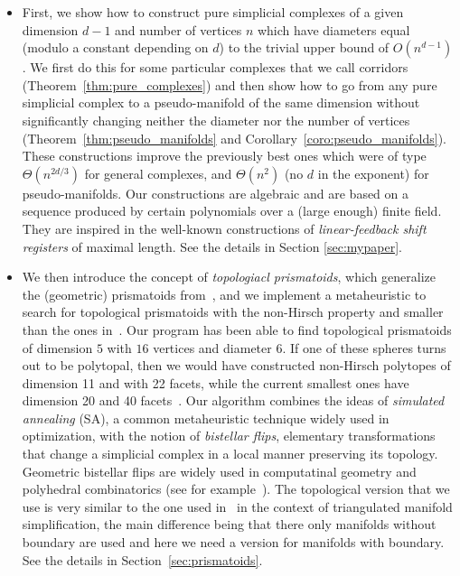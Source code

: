 \documentclass[12pt,a4paper]{article}
\theoremstyle{plain}
\theoremstyle{definition}
\begin{document}
\begin{itemize}
\item First, we show how to construct pure simplicial complexes of a given dimension $d-1$ and number of vertices $n$ which have diameters equal (modulo a constant depending on $d$) to the trivial upper bound of $O(n^{d-1})$. We first do this for some particular complexes that we call corridors 
(Theorem~\ref{thm:pure_complexes}) and then show how to go from any pure simplicial complex to a pseudo-manifold of the same dimension without significantly changing neither the diameter nor the number of vertices (Theorem~\ref{thm:pseudo_manifolds} and Corollary~\ref{coro:pseudo_manifolds}). These constructions improve the previously best ones which were of type $\Theta(n^{2d/3})$ for general complexes, and $\Theta(n^2)$ (no $d$ in the exponent) for pseudo-manifolds. Our constructions are algebraic and are based on a sequence produced by certain polynomials over a (large enough) finite field. They are inspired in the well-known constructions of \emph{linear-feedback shift registers} of maximal length. See the details in Section \ref{sec:mypaper}.

\item We then introduce the concept of \emph{topologiacl prismatoids}, which generalize the (geometric) prismatoids from~\cite{counterexample,improvement}, and we implement a metaheuristic to search for topological prismatoids with the non-Hirsch property and smaller than the ones in~\cite{counterexample,improvement}. Our program has been able to find topological prismatoids of dimension $5$ with $16$ vertices and diameter $6$. If one of these spheres turns out to be polytopal, then we would have constructed non-Hirsch polytopes of dimension 11 and with 22 facets, while the current smallest ones have dimension 20 and 40 facets~\cite{improvement}. Our algorithm combines the ideas of  \emph{simulated annealing} (SA), a common metaheuristic technique widely used in optimization, with the notion of \emph{bistellar flips}, elementary transformations that change a simplicial complex in a local manner preserving its topology. Geometric bistellar flips are widely used in computatinal geometry and polyhedral combinatorics (see for example~\cite{SantosFlips}). The topological version that we use is very similar to the one used in~\cite{Lutz} in the context of triangulated manifold simplification, the main difference being that there only manifolds without boundary are used and here we need a version for manifolds with boundary. See the details in Section~\ref{sec:prismatoids}.
\end{itemize}
\end{document}
